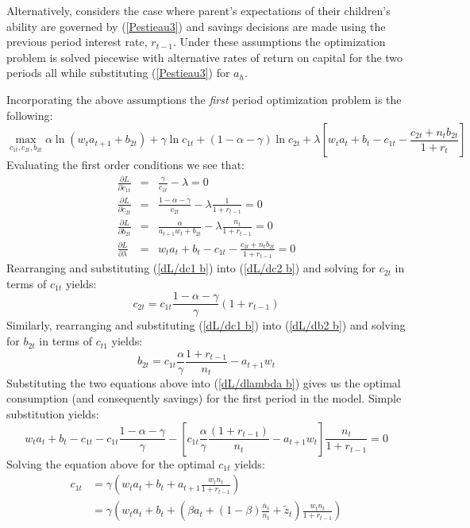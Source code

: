 \documentclass{article}
\begin{document}
Alternatively, \citet{pestieau-1984-oep} considers the case where parent's expectations of their children's ability are governed by (\ref{Pestieau3}) and savings decisions are made using the previous period interest rate, $r_{t-1}$.  Under these assumptions the optimization problem is solved piecewise with alternative rates of return on capital for the two periods all while substituting (\ref{Pestieau3}) for $a_h$.

Incorporating the above assumptions the \emph{first} period optimization problem is the following:
\begin{equation}
\max_{c_{1t}, c_{2t}, b_{2t}}\alpha \ln (w_t a_{t+1} + b_{2t})
+ \gamma \ln c_{1t}
+ (1-\alpha-\gamma) \ln c_{2t}
+ \lambda [ w_t a_t + b_t - c_{1t} - \frac{c_{2t} + n_t b_{2t}}{1+r_t}]
\end{equation}
Evaluating the first order conditions we see that:
\begin{eqnarray}
\frac{\partial L}{\partial c_{1t}} &=& \frac{\gamma}{c_{1t}} - \lambda = 0  \label{dL/dc1 b} \\
\frac{\partial L}{\partial c_{2t}} &=& \frac{1-\alpha-\gamma}{c_{2t}}-\lambda\frac{1}{1+r_{t-1}} = 0 \label{dL/dc2 b}\\
\frac{\partial L}{\partial b_{2t}} &=& \frac{\alpha}{a_{t+1} w_t + b_{2t}} - \lambda \frac{n_t}{1+r_{t-1}} = 0 \label{dL/db2 b}\\
\frac{\partial L}{\partial \lambda} &=& w_t a_t + b_t - c_{1t} - \frac{ c_{2t}+ n_t b_{2t}} {1+r_{t-1}}  = 0 \label{dL/dlambda b}
\end{eqnarray}
Rearranging and substituting (\ref{dL/dc1 b}) into (\ref{dL/dc2 b}) and solving for $c_{2t}$ in terms of $c_{1t}$ yields:
\begin{equation}
c_{2t} = c_{1t}\frac{1-\alpha-\gamma}{\gamma}(1+r_{t-1})
\end{equation}
Similarly, rearranging and substituting (\ref{dL/dc1 b}) into (\ref{dL/db2 b}) and solving for $b_{2t}$ in terms of $c_{t1}$ yields:
\begin{equation}
b_{2t} = c_{1t} \frac{\alpha}{\gamma}\frac{1+r_{t-1}}{n_t} - a_{t+1}w_t
\end{equation}
Substituting the two equations above into (\ref{dL/dlambda b}) gives us the optimal consumption (and consequently savings) for the first period in the model. Simple substitution yields:
\begin{equation*}
w_t a_t + b_t - c_{1t} - c_{1t}\frac{1-\alpha-\gamma}{\gamma} - [c_{1t}\frac{\alpha}{\gamma}\frac{(1+r_{t-1})}{n_t}-a_{t+1}w_t]\frac{n_t}{1+r_{t-1}}=0
\end{equation*}
Solving the equation above for the optimal $c_{1t}$ yields:
\begin{equation}\label{opt c1 b}
\begin{split}
c_{1t}
&= \gamma(w_t a_t + b_t + a_{t+1}\frac{w_t n_t}{1+r_{t-1}})\\
&= \gamma(w_t a_t + b_t + (\beta a_t + (1-\beta)\frac{\overline{n}_{t}}{n_t}+\tilde{z}_t)\frac{w_t n_t}{1+r_{t-1}})
\end{split}
\end{equation}
\end{document}
